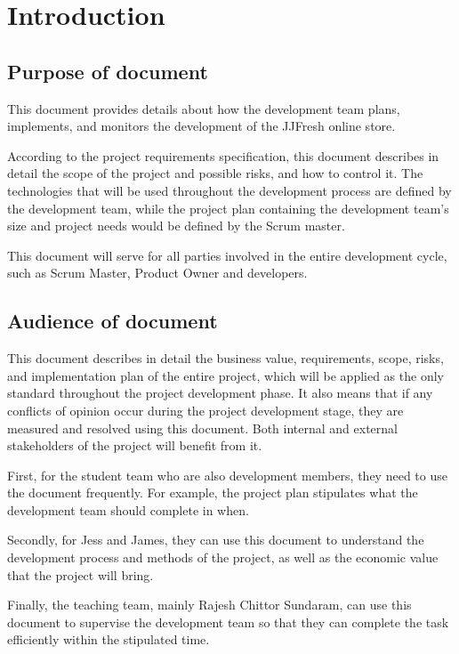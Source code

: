 \chapter{Introduction}
\label{chap:intro}
\section{Purpose of document}
   This document provides details about how the development team plans, implements, and monitors the development of the JJFresh online store. 

   According to the project requirements specification, this document describes in detail the scope of the project and possible risks, and how to control it. The technologies that will be used throughout the development process are defined by the development team, while the project plan containing the development team's size and project needs would be defined by the Scrum master.

   This document will serve for all parties involved in the entire development cycle, such as Scrum Master, Product Owner and developers.

\section{Audience of document}
\label{sec:audienceOfDocument}
This document describes in detail the business value, requirements, scope, risks, and implementation plan of the entire project, which will be applied as the only standard throughout the project development phase. It also means that if any conflicts of opinion occur during the project development stage, they are measured and resolved using this document. Both internal and external stakeholders of the project will benefit from it.

First, for the student team who are also development members, they need to use the document frequently. For example, the project plan stipulates what the development team should complete in when. 

Secondly, for Jess and James, they can use this document to understand the development process and methods of the project, as well as the economic value that the project will bring. 

Finally, the teaching team, mainly Rajesh Chittor Sundaram, can use this document to supervise the development team so that they can complete the task efficiently within the stipulated time.

